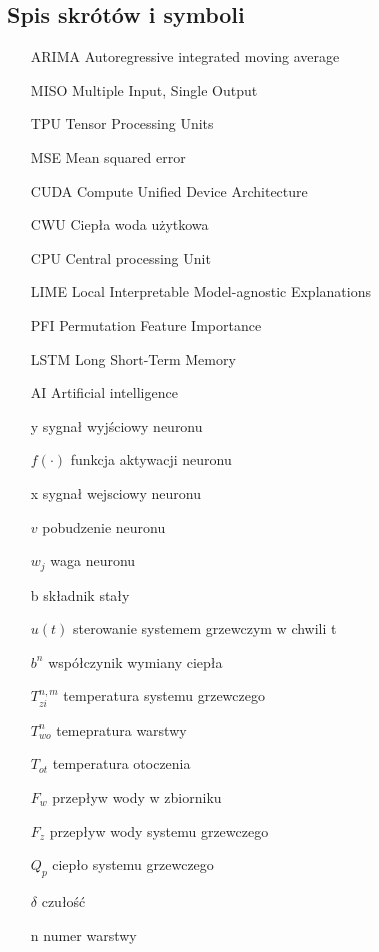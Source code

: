 \documentclass[a4paper,twoside,12pt]{book}
\begin{document}
\begin{appendices}

  \chapter{Spis skrótów i symboli}

  \begin{itemize}
    \item[ARIMA] Autoregressive integrated moving average
    \item[MISO] Multiple Input, Single Output
    \item[TPU] Tensor Processing Units
    \item[MSE] Mean squared error
    \item[CUDA] Compute Unified Device Architecture
    \item[CWU] Ciepła woda użytkowa
    \item[CPU] Central processing Unit
    \item[LIME] Local Interpretable Model-agnostic Explanations
    \item[PFI] Permutation Feature Importance
    \item[LSTM] Long Short-Term Memory
    \item[AI] Artificial intelligence
    \item[y] sygnał wyjściowy neuronu
    \item[$f(\cdot)$] funkcja aktywacji neuronu
    \item[x] sygnał wejsciowy neuronu
    \item[$v$] pobudzenie neuronu
    \item[$w_j$]  waga neuronu
    \item[b] składnik stały
    \item[$u(t)$] sterowanie systemem grzewczym w chwili t
    \item[$b^n$] współczynik wymiany ciepła
    \item[$T_{zi}^{n,m}$] temperatura systemu grzewczego
    \item[$T_{wo}^{n}$] temepratura warstwy
    \item[$T_{ot}$] temperatura otoczenia
    \item[$F_w$] przepływ wody w zbiorniku
    \item[$F_z$] przepływ wody systemu grzewczego
    \item[$Q_p$] ciepło systemu grzewczego
    \item[$\delta$] czułość
    \item[n] numer warstwy

\end{itemize}
\end{appendices}
\end{document}
